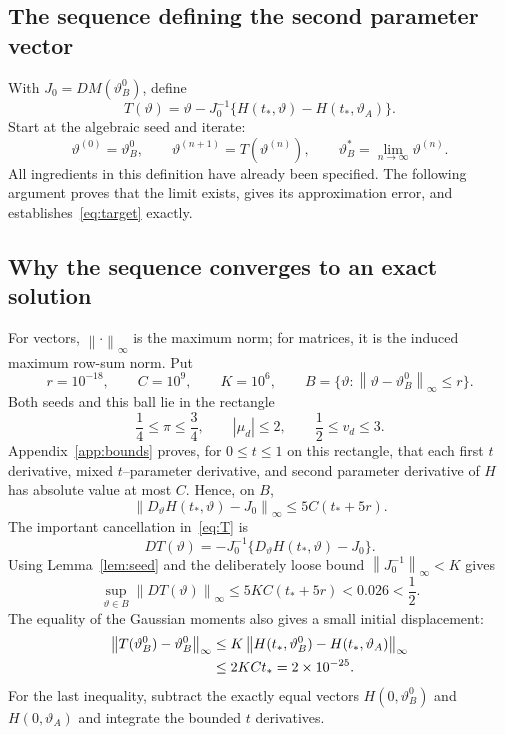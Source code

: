 \documentclass[11pt,a4paper]{article}
\numberwithin{equation}{section}
\newcommand{\vt}{\vartheta}
\newcommand{\norm}[1]{\left\lVert#1\right\rVert_\infty}
\begin{document}
\subsection{The sequence defining the second parameter vector}
With $J_0=DM(\vt_B^0)$, define
\begin{equation}\label{eq:T}
 T(\vt)=\vt-J_0^{-1}\{H(t_*,\vt)-H(t_*,\vt_A)\}.
\end{equation}
Start at the algebraic seed and iterate:
\begin{equation}\label{eq:iteration}
 \vt^{(0)}=\vt_B^0,\qquad
 \vt^{(n+1)}=T(\vt^{(n)}),\qquad
 \vt_B^*=\lim_{n\to\infty}\vt^{(n)}.
\end{equation}
All ingredients in this definition have already been specified. The following argument proves that the limit exists, gives its approximation error, and establishes~\eqref{eq:target} exactly.

\subsection{Why the sequence converges to an exact solution}
For vectors, $\norm{\cdot}$ is the maximum norm; for matrices, it is the induced maximum row-sum norm. Put
\[
 r=10^{-18},\qquad C=10^9,\qquad K=10^6,
 \qquad B=\{\vt:\norm{\vt-\vt_B^0}\le r\}.
\]
Both seeds and this ball lie in the rectangle
\begin{equation}\label{eq:rectangle}
 \frac14\le\pi\le\frac34,\qquad |\mu_d|\le2,\qquad
 \frac12\le v_d\le3.
\end{equation}
Appendix~\ref{app:bounds} proves, for $0\le t\le1$ on this rectangle, that each first $t$ derivative, mixed $t$--parameter derivative, and second parameter derivative of $H$ has absolute value at most $C$. Hence, on $B$,
\begin{equation}\label{eq:Jclose}
 \norm{D_\vt H(t_*,\vt)-J_0}\le5C(t_*+5r).
\end{equation}
The important cancellation in~\eqref{eq:T} is
\[
 DT(\vt)=-J_0^{-1}\{D_\vt H(t_*,\vt)-J_0\}.
\]
Using Lemma~\ref{lem:seed} and the deliberately loose bound $\norm{J_0^{-1}}<K$ gives
\begin{equation}\label{eq:contract}
 \sup_{\vt\in B}\norm{DT(\vt)}
 \le5KC(t_*+5r)<0.026<\frac12.
\end{equation}
The equality of the Gaussian moments also gives a small initial displacement:
\begin{align}\label{eq:displacement}
 \norm{T(\vt_B^0)-\vt_B^0}
 &\le K\norm{H(t_*,\vt_B^0)-H(t_*,\vt_A)}\notag\\
 &\le2KCt_*=2\times10^{-25}.
\end{align}
For the last inequality, subtract the exactly equal vectors $H(0,\vt_B^0)$ and $H(0,\vt_A)$ and integrate the bounded $t$ derivatives.
\end{document}
